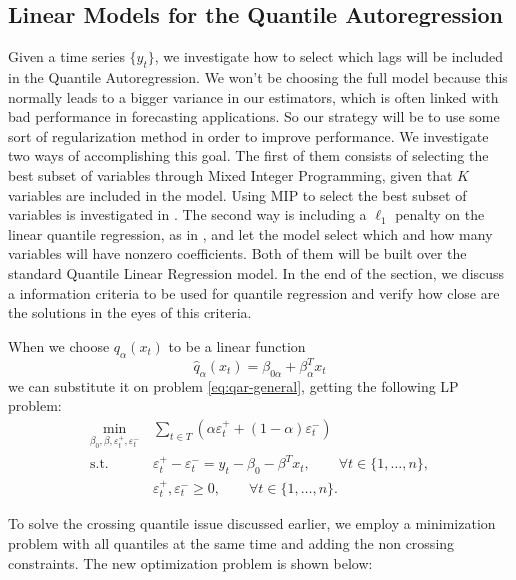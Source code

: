 \subsection{Linear Models for the Quantile Autoregression}
\label{sec:linear-models}

Given a time series $\{y_t\}$, we investigate how to select which lags will be included in the Quantile Autoregression. We won't be choosing the full model because this normally leads to a bigger variance in our estimators, which is often linked with bad performance in forecasting applications. So our strategy will be to use some sort of regularization method in order to improve performance.
We investigate two ways of accomplishing this goal.
The first of them consists of selecting the best subset of variables through Mixed Integer Programming, given that $K$ variables are included in the model. Using MIP to select the best subset of variables is investigated in \cite{bertsimas2015best}. The second way is including a $\ell_1$ penalty on the linear quantile regression, as in \cite{kim2009ell_1}, and let the model select which and how many variables will have nonzero coefficients. 
Both of them will be built over the standard Quantile Linear Regression model. In the end of the section, we discuss a information criteria to be used for quantile regression and verify how close are the solutions in the eyes of this criteria.

When we choose $q_\alpha(x_t)$ to be a linear function
\begin{equation}
\hat{q}_\alpha(x_t) = \beta_{0\alpha} + \beta_\alpha^T x_t
\end{equation}
we can substitute it on problem \ref{eq:qar-general}, getting the following LP problem:
\begin{equation}
\begin{aligned}
 \underset{\beta_0,\beta,\varepsilon_{t}^{+},\varepsilon_{t}^{-}}{\text{min}}\, & \sum_{t \in T}\left(\alpha\varepsilon_{t}^{+}+(1-\alpha)\varepsilon_{t}^{-}\right) \\
\mbox{s.t. } & \varepsilon_{t}^{+}-\varepsilon_{t}^{-}=y_{t} - \beta_0 - \beta^T x_{t},\qquad\forall t\in\{1,\dots,n\},\\
& \varepsilon_t^+,\varepsilon_t^- \geq 0, \qquad \forall t \in \{1,\dots,n\}.
\end{aligned}
\label{eq:qar-lp}
\end{equation}

To solve the crossing quantile issue discussed earlier, we employ a minimization problem with all quantiles at the same time and adding the non crossing constraints. The new optimization problem is shown below:


